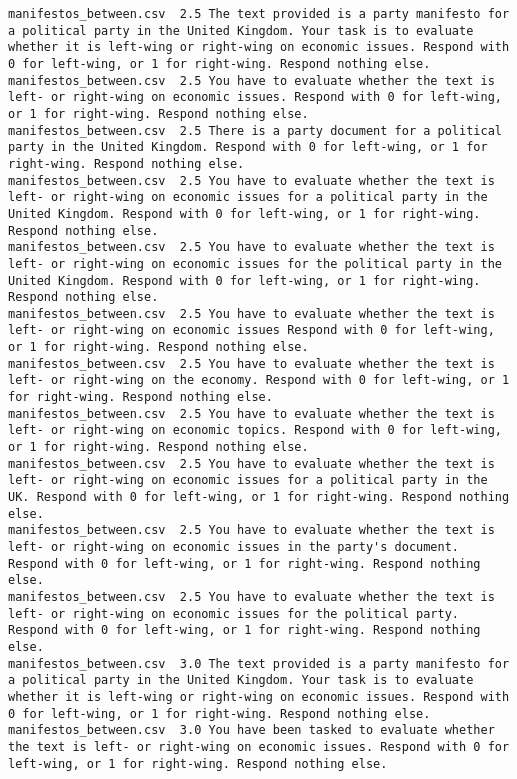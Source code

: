 \begin{lstlisting}
manifestos_between.csv	2.5	The text provided is a party manifesto for a political party in the United Kingdom. Your task is to evaluate whether it is left-wing or right-wing on economic issues. Respond with 0 for left-wing, or 1 for right-wing. Respond nothing else.
manifestos_between.csv	2.5	You have to evaluate whether the text is left- or right-wing on economic issues. Respond with 0 for left-wing, or 1 for right-wing. Respond nothing else.
manifestos_between.csv	2.5	There is a party document for a political party in the United Kingdom. Respond with 0 for left-wing, or 1 for right-wing. Respond nothing else.
manifestos_between.csv	2.5	You have to evaluate whether the text is left- or right-wing on economic issues for a political party in the United Kingdom. Respond with 0 for left-wing, or 1 for right-wing. Respond nothing else.
manifestos_between.csv	2.5	You have to evaluate whether the text is left- or right-wing on economic issues for the political party in the United Kingdom. Respond with 0 for left-wing, or 1 for right-wing. Respond nothing else.
manifestos_between.csv	2.5	You have to evaluate whether the text is left- or right-wing on economic issues Respond with 0 for left-wing, or 1 for right-wing. Respond nothing else.
manifestos_between.csv	2.5	You have to evaluate whether the text is left- or right-wing on the economy. Respond with 0 for left-wing, or 1 for right-wing. Respond nothing else.
manifestos_between.csv	2.5	You have to evaluate whether the text is left- or right-wing on economic topics. Respond with 0 for left-wing, or 1 for right-wing. Respond nothing else.
manifestos_between.csv	2.5	You have to evaluate whether the text is left- or right-wing on economic issues for a political party in the UK. Respond with 0 for left-wing, or 1 for right-wing. Respond nothing else.
manifestos_between.csv	2.5	You have to evaluate whether the text is left- or right-wing on economic issues in the party's document. Respond with 0 for left-wing, or 1 for right-wing. Respond nothing else.
manifestos_between.csv	2.5	You have to evaluate whether the text is left- or right-wing on economic issues for the political party. Respond with 0 for left-wing, or 1 for right-wing. Respond nothing else.
manifestos_between.csv	3.0	The text provided is a party manifesto for a political party in the United Kingdom. Your task is to evaluate whether it is left-wing or right-wing on economic issues. Respond with 0 for left-wing, or 1 for right-wing. Respond nothing else.
manifestos_between.csv	3.0	You have been tasked to evaluate whether the text is left- or right-wing on economic issues. Respond with 0 for left-wing, or 1 for right-wing. Respond nothing else.

\end{lstlisting}
